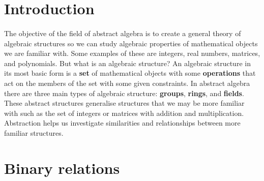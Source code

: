 \documentclass[../abstract_algebra.tex]{subfiles}
\begin{document}
    \section{Introduction}
        \paragraph{}
        The objective of the field of abstract algebra is to create a general theory of algebraic structures so we can study algebraic properties of mathematical objects we are familiar with.
        Some examples of these are integers, real numbers, matrices, and polynomials.
        But what is an algebraic structure?
        An algebraic structure in its most basic form is a \textbf{set} of mathematical objects with some \textbf{operations} that act on the members of the set with some given constraints.
        In abstract algebra there are three main types of algebraic structure: \textbf{groups}, \textbf{rings}, and \textbf{fields}.
        These abstract structures generalise structures that we may be more familiar with such as the set of integers or matrices with addition and multiplication.
        Abstraction helps us investigate similarities and relationships between more familiar structures.

    \section{Binary relations}
\end{document}
